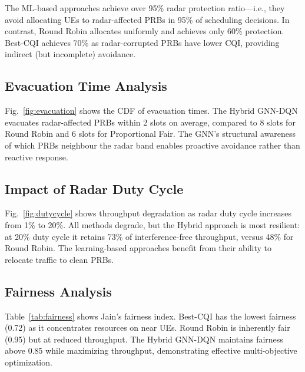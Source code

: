 \documentclass[conference]{IEEEtran}
\begin{document}
The ML-based approaches achieve over 95\% radar protection ratio---i.e., they avoid allocating UEs to radar-affected PRBs in 95\% of scheduling decisions. In contrast, Round Robin allocates uniformly and achieves only 60\% protection. Best-CQI achieves 70\% as radar-corrupted PRBs have lower CQI, providing indirect (but incomplete) avoidance.

\subsection{Evacuation Time Analysis}

Fig.~\ref{fig:evacuation} shows the CDF of evacuation times. The Hybrid GNN-DQN evacuates radar-affected PRBs within 2 slots on average, compared to 8 slots for Round Robin and 6 slots for Proportional Fair. The GNN's structural awareness of which PRBs neighbour the radar band enables proactive avoidance rather than reactive response.


\subsection{Impact of Radar Duty Cycle}

Fig.~\ref{fig:dutycycle} shows throughput degradation as radar duty cycle increases from 1\% to 20\%. All methods degrade, but the Hybrid approach is most resilient: at 20\% duty cycle it retains 73\% of interference-free throughput, versus 48\% for Round Robin. The learning-based approaches benefit from their ability to relocate traffic to clean PRBs.


\subsection{Fairness Analysis}

Table~\ref{tab:fairness} shows Jain's fairness index. Best-CQI has the lowest fairness (0.72) as it concentrates resources on near UEs. Round Robin is inherently fair (0.95) but at reduced throughput. The Hybrid GNN-DQN maintains fairness above 0.85 while maximizing throughput, demonstrating effective multi-objective optimization.
\end{document}
